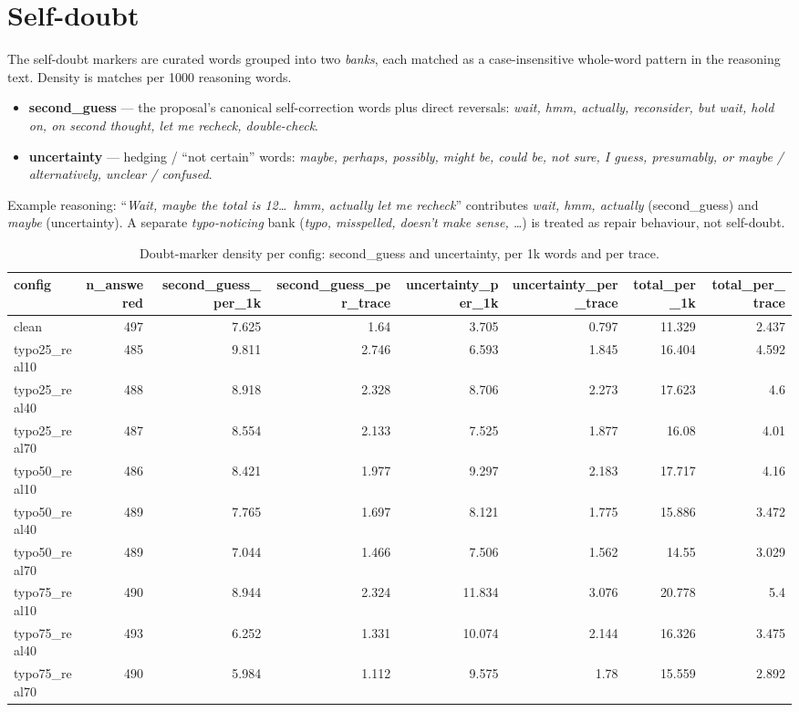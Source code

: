 \documentclass[11pt]{article}
\begin{document}
\section*{Self-doubt}
\noindent The self-doubt markers are curated words grouped into two
\emph{banks}, each matched as a case-insensitive whole-word pattern in the reasoning
text. Density is matches per 1000 reasoning words.
\begin{itemize}\setlength{\itemsep}{1pt}
  \item \textbf{second\_guess} --- the proposal's canonical self-correction words plus
  direct reversals: \emph{wait, hmm, actually, reconsider, but wait, hold on, on second
  thought, let me recheck, double-check}.
  \item \textbf{uncertainty} --- hedging / ``not certain'' words: \emph{maybe, perhaps,
  possibly, might be, could be, not sure, I guess, presumably, or maybe / alternatively,
  unclear / confused}.
\end{itemize}
\noindent Example reasoning: ``\emph{Wait, maybe the total is 12\dots\ hmm, actually let
me recheck}'' contributes \emph{wait, hmm, actually} (second\_guess) and \emph{maybe}
(uncertainty). A separate \emph{typo-noticing} bank (\emph{typo, misspelled, doesn't make
sense, \dots}) is treated as repair behaviour, not self-doubt.
\medskip

\begin{table}[H]
\centering
\caption{Doubt-marker density per config: second\_guess and uncertainty, per 1k words and per trace.}
\small
\begin{adjustbox}{max width=\textwidth}
\begin{tabular}{lrrrrrrr}
\toprule
\textbf{config} & \textbf{n\_answered} & \textbf{second\_guess\_per\_1k} & \textbf{second\_guess\_per\_trace} & \textbf{uncertainty\_per\_1k} & \textbf{uncertainty\_per\_trace} & \textbf{total\_per\_1k} & \textbf{total\_per\_trace} \\
\midrule
clean & 497 & 7.625 & 1.64 & 3.705 & 0.797 & 11.329 & 2.437 \\
typo25\_real10 & 485 & 9.811 & 2.746 & 6.593 & 1.845 & 16.404 & 4.592 \\
typo25\_real40 & 488 & 8.918 & 2.328 & 8.706 & 2.273 & 17.623 & 4.6 \\
typo25\_real70 & 487 & 8.554 & 2.133 & 7.525 & 1.877 & 16.08 & 4.01 \\
typo50\_real10 & 486 & 8.421 & 1.977 & 9.297 & 2.183 & 17.717 & 4.16 \\
typo50\_real40 & 489 & 7.765 & 1.697 & 8.121 & 1.775 & 15.886 & 3.472 \\
typo50\_real70 & 489 & 7.044 & 1.466 & 7.506 & 1.562 & 14.55 & 3.029 \\
typo75\_real10 & 490 & 8.944 & 2.324 & 11.834 & 3.076 & 20.778 & 5.4 \\
typo75\_real40 & 493 & 6.252 & 1.331 & 10.074 & 2.144 & 16.326 & 3.475 \\
typo75\_real70 & 490 & 5.984 & 1.112 & 9.575 & 1.78 & 15.559 & 2.892 \\
\bottomrule
\end{tabular}
\end{adjustbox}
\end{table}
\end{document}
